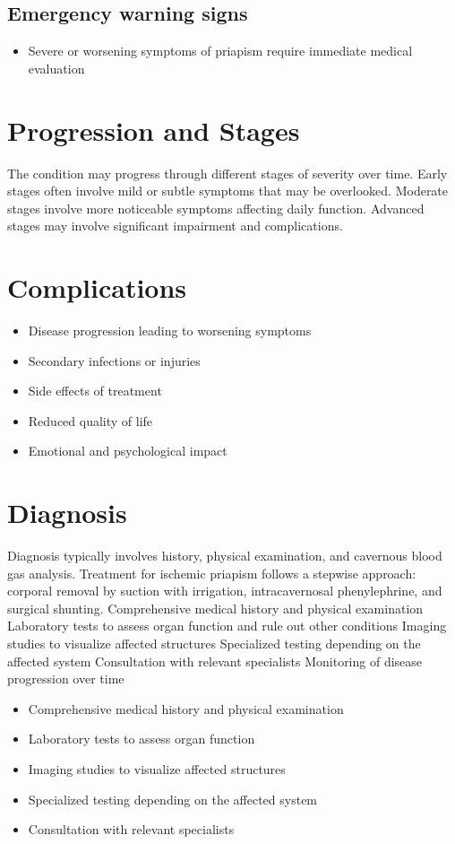 \subsection{Emergency warning signs}
\begin{itemize}[noitemsep]
  \item Severe or worsening symptoms of priapism require immediate medical evaluation
\end{itemize}
\section{Progression and Stages}
The condition may progress through different stages of severity over time. Early stages often involve mild or subtle symptoms that may be overlooked. Moderate stages involve more noticeable symptoms affecting daily function. Advanced stages may involve significant impairment and complications.
\section{Complications}
\begin{itemize}[noitemsep]
  \item Disease progression leading to worsening symptoms
  \item Secondary infections or injuries
  \item Side effects of treatment
  \item Reduced quality of life
  \item Emotional and psychological impact
\end{itemize}
\section{Diagnosis}
Diagnosis typically involves history, physical examination, and cavernous blood gas analysis. Treatment for ischemic priapism follows a stepwise approach: corporal removal by suction with irrigation, intracavernosal phenylephrine, and surgical shunting. Comprehensive medical history and physical examination Laboratory tests to assess organ function and rule out other conditions Imaging studies to visualize affected structures Specialized testing depending on the affected system Consultation with relevant specialists Monitoring of disease progression over time

\begin{itemize}[noitemsep]
  \item Comprehensive medical history and physical examination
  \item Laboratory tests to assess organ function
  \item Imaging studies to visualize affected structures
  \item Specialized testing depending on the affected system
  \item Consultation with relevant specialists
\end{itemize}
